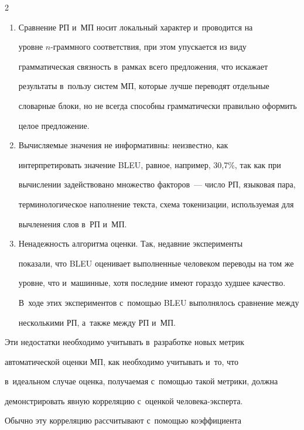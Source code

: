 \begin{multicols}{2}
\begin{enumerate}[1.]
себе разную функциональную нагрузку и~имеют неодинаковую 


релевантность для формирования предложения.


  \item Сравнение РП и~МП носит локальный характер и~проводится на 


уровне $n$-грам\-мно\-го соответствия, при этом упускается из виду 


грамматическая связность в~рамках всего предложения, что искажает 


результаты в~пользу систем МП, которые лучше переводят отдельные 


словарные блоки, но не всегда способны грамматически правильно оформить 


целое предложение.


  \item Вычисляемые значения не информативны: неизвестно, как 


интерпретировать значение BLEU, равное, например, 30,7\%, так как при 


вычислении задействовано множество факторов~--- число РП, языковая пара, 


терминологическое наполнение текста, схема токенизации, используемая для 


вычленения слов в~РП и~МП.


  \item Ненадежность алгоритма оценки. Так, недавние эксперименты 


показали, что BLEU оценивает выполненные человеком переводы на том же 


уровне, что и~машинные, хотя последние имеют гораздо худшее качество. 


В~ходе этих экспериментов с~помощью BLEU выполнялось сравнение между 


несколькими РП, а~также между РП и~МП.


  \end{enumerate}


  


  Эти недостатки необходимо учитывать в~разработке новых метрик 


автоматической оценки МП, как необходимо учитывать и~то, что 


в~идеальном случае оценка, получаемая с~помощью такой мет\-ри\-ки, должна 


демонстрировать явную корреляцию с~оценкой че\-ло\-ве\-ка-экс\-пер\-та. 


Обычно эту корреляцию рассчитывают с~помощью коэффициента 



\end{multicols}

